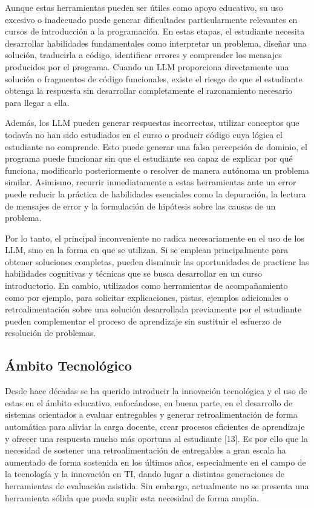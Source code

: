 \documentclass[letterpaper, 10 pt, conference]{ieeeconf}
\begin{document}
    Aunque estas herramientas pueden ser útiles como apoyo educativo, su uso excesivo o inadecuado puede generar dificultades particularmente relevantes en cursos de introducción a la programación. En estas etapas, el estudiante necesita desarrollar habilidades fundamentales como interpretar un problema, diseñar una solución, traducirla a código, identificar errores y comprender los mensajes producidos por el programa. Cuando un LLM proporciona directamente una solución o fragmentos de código funcionales, existe el riesgo de que el estudiante obtenga la respuesta sin desarrollar completamente el razonamiento necesario para llegar a ella.

    Además, los LLM pueden generar respuestas incorrectas, utilizar conceptos que todavía no han sido estudiados en el curso o producir código cuya lógica el estudiante no comprende. Esto puede generar una falsa percepción de dominio, el programa puede funcionar sin que el estudiante sea capaz de explicar por qué funciona, modificarlo posteriormente o resolver de manera autónoma un problema similar. Asimismo, recurrir inmediatamente a estas herramientas ante un error puede reducir la práctica de habilidades esenciales como la depuración, la lectura de mensajes de error y la formulación de hipótesis sobre las causas de un problema.

    Por lo tanto, el principal inconveniente no radica necesariamente en el uso de los LLM, sino en la forma en que se utilizan. Si se emplean principalmente para obtener soluciones completas, pueden disminuir las oportunidades de practicar las habilidades cognitivas y técnicas que se busca desarrollar en un curso introductorio. En cambio, utilizados como herramientas de acompañamiento como por ejemplo, para solicitar explicaciones, pistas, ejemplos adicionales o retroalimentación sobre una solución desarrollada previamente por el estudiante pueden complementar el proceso de aprendizaje sin sustituir el esfuerzo de resolución de problemas.

    \subsection{Ámbito Tecnológico} 
    Desde hace décadas se ha querido introducir la innovación tecnológica y el uso de estas en el ámbito educativo, enfocándose, en buena parte, en el desarrollo de sistemas orientados a evaluar entregables y generar retroalimentación de forma automática para aliviar la carga docente, crear procesos eficientes de aprendizaje y ofrecer una respuesta mucho más oportuna al estudiante [13]. Es por ello que la necesidad de sostener una retroalimentación de entregables a gran escala ha aumentado de forma sostenida en los últimos años, especialmente en el campo de la tecnología y la innovación en TI, dando lugar a distintas generaciones de herramientas de evaluación asistida. Sin embargo, actualmente no se presenta una herramienta sólida que pueda suplir esta necesidad de forma amplia.
\end{document}
